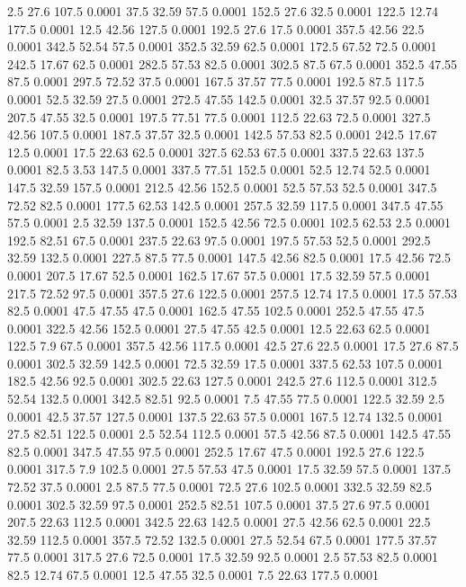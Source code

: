 2.5	27.6	107.5	0.0001
37.5	32.59	57.5	0.0001
152.5	27.6	32.5	0.0001
122.5	12.74	177.5	0.0001
12.5	42.56	127.5	0.0001
192.5	27.6	17.5	0.0001
357.5	42.56	22.5	0.0001
342.5	52.54	57.5	0.0001
352.5	32.59	62.5	0.0001
172.5	67.52	72.5	0.0001
242.5	17.67	62.5	0.0001
282.5	57.53	82.5	0.0001
302.5	87.5	67.5	0.0001
352.5	47.55	87.5	0.0001
297.5	72.52	37.5	0.0001
167.5	37.57	77.5	0.0001
192.5	87.5	117.5	0.0001
52.5	32.59	27.5	0.0001
272.5	47.55	142.5	0.0001
32.5	37.57	92.5	0.0001
207.5	47.55	32.5	0.0001
197.5	77.51	77.5	0.0001
112.5	22.63	72.5	0.0001
327.5	42.56	107.5	0.0001
187.5	37.57	32.5	0.0001
142.5	57.53	82.5	0.0001
242.5	17.67	12.5	0.0001
17.5	22.63	62.5	0.0001
327.5	62.53	67.5	0.0001
337.5	22.63	137.5	0.0001
82.5	3.53	147.5	0.0001
337.5	77.51	152.5	0.0001
52.5	12.74	52.5	0.0001
147.5	32.59	157.5	0.0001
212.5	42.56	152.5	0.0001
52.5	57.53	52.5	0.0001
347.5	72.52	82.5	0.0001
177.5	62.53	142.5	0.0001
257.5	32.59	117.5	0.0001
347.5	47.55	57.5	0.0001
2.5	32.59	137.5	0.0001
152.5	42.56	72.5	0.0001
102.5	62.53	2.5	0.0001
192.5	82.51	67.5	0.0001
237.5	22.63	97.5	0.0001
197.5	57.53	52.5	0.0001
292.5	32.59	132.5	0.0001
227.5	87.5	77.5	0.0001
147.5	42.56	82.5	0.0001
17.5	42.56	72.5	0.0001
207.5	17.67	52.5	0.0001
162.5	17.67	57.5	0.0001
17.5	32.59	57.5	0.0001
217.5	72.52	97.5	0.0001
357.5	27.6	122.5	0.0001
257.5	12.74	17.5	0.0001
17.5	57.53	82.5	0.0001
47.5	47.55	47.5	0.0001
162.5	47.55	102.5	0.0001
252.5	47.55	47.5	0.0001
322.5	42.56	152.5	0.0001
27.5	47.55	42.5	0.0001
12.5	22.63	62.5	0.0001
122.5	7.9	67.5	0.0001
357.5	42.56	117.5	0.0001
42.5	27.6	22.5	0.0001
17.5	27.6	87.5	0.0001
302.5	32.59	142.5	0.0001
72.5	32.59	17.5	0.0001
337.5	62.53	107.5	0.0001
182.5	42.56	92.5	0.0001
302.5	22.63	127.5	0.0001
242.5	27.6	112.5	0.0001
312.5	52.54	132.5	0.0001
342.5	82.51	92.5	0.0001
7.5	47.55	77.5	0.0001
122.5	32.59	2.5	0.0001
42.5	37.57	127.5	0.0001
137.5	22.63	57.5	0.0001
167.5	12.74	132.5	0.0001
27.5	82.51	122.5	0.0001
2.5	52.54	112.5	0.0001
57.5	42.56	87.5	0.0001
142.5	47.55	82.5	0.0001
347.5	47.55	97.5	0.0001
252.5	17.67	47.5	0.0001
192.5	27.6	122.5	0.0001
317.5	7.9	102.5	0.0001
27.5	57.53	47.5	0.0001
17.5	32.59	57.5	0.0001
137.5	72.52	37.5	0.0001
2.5	87.5	77.5	0.0001
72.5	27.6	102.5	0.0001
332.5	32.59	82.5	0.0001
302.5	32.59	97.5	0.0001
252.5	82.51	107.5	0.0001
37.5	27.6	97.5	0.0001
207.5	22.63	112.5	0.0001
342.5	22.63	142.5	0.0001
27.5	42.56	62.5	0.0001
22.5	32.59	112.5	0.0001
357.5	72.52	132.5	0.0001
27.5	52.54	67.5	0.0001
177.5	37.57	77.5	0.0001
317.5	27.6	72.5	0.0001
17.5	32.59	92.5	0.0001
2.5	57.53	82.5	0.0001
82.5	12.74	67.5	0.0001
12.5	47.55	32.5	0.0001
7.5	22.63	177.5	0.0001
